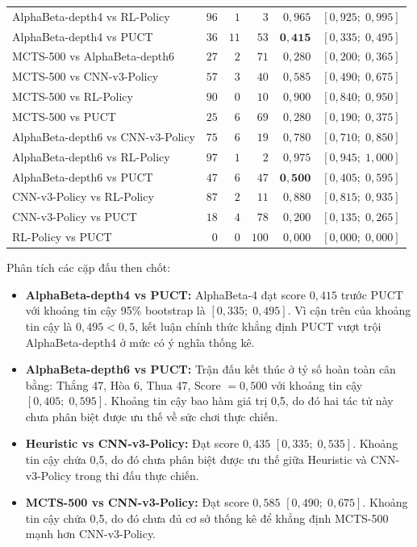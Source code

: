 \documentclass[11pt, a4paper]{article}
\begin{document}
\begin{table}[H]
\begin{tabular}{@{} l r r r r r @{}}
        AlphaBeta-depth4 vs RL-Policy & $96$ & $1$ & $3$ & $0{,}965$ & $[0{,}925;\; 0{,}995]$ \\
        AlphaBeta-depth4 vs PUCT & $36$ & $11$ & $53$ & $\mathbf{0{,}415}$ & $[0{,}335;\; 0{,}495]$ \\
        \midrule
        MCTS-500 vs AlphaBeta-depth6 & $27$ & $2$ & $71$ & $0{,}280$ & $[0{,}200;\; 0{,}365]$ \\
        MCTS-500 vs CNN-v3-Policy & $57$ & $3$ & $40$ & $0{,}585$ & $[0{,}490;\; 0{,}675]$ \\
        MCTS-500 vs RL-Policy & $90$ & $0$ & $10$ & $0{,}900$ & $[0{,}840;\; 0{,}950]$ \\
        MCTS-500 vs PUCT & $25$ & $6$ & $69$ & $0{,}280$ & $[0{,}190;\; 0{,}375]$ \\
        \midrule
        AlphaBeta-depth6 vs CNN-v3-Policy & $75$ & $6$ & $19$ & $0{,}780$ & $[0{,}710;\; 0{,}850]$ \\
        AlphaBeta-depth6 vs RL-Policy & $97$ & $1$ & $2$ & $0{,}975$ & $[0{,}945;\; 1{,}000]$ \\
        AlphaBeta-depth6 vs PUCT & $47$ & $6$ & $47$ & $\mathbf{0{,}500}$ & $[0{,}405;\; 0{,}595]$ \\
        \midrule
        CNN-v3-Policy vs RL-Policy & $87$ & $2$ & $11$ & $0{,}880$ & $[0{,}815;\; 0{,}935]$ \\
        CNN-v3-Policy vs PUCT & $18$ & $4$ & $78$ & $0{,}200$ & $[0{,}135;\; 0{,}265]$ \\
        RL-Policy vs PUCT & $0$ & $0$ & $100$ & $0{,}000$ & $[0{,}000;\; 0{,}000]$ \\
        \bottomrule
    \end{tabular}
\end{table}

Phân tích các cặp đấu then chốt:
\begin{itemize}
    \item \textbf{AlphaBeta-depth4 vs PUCT:} AlphaBeta-4 đạt score $0{,}415$ trước PUCT với khoảng tin cậy 95\% bootstrap là $[0{,}335;\; 0{,}495]$. Vì cận trên của khoảng tin cậy là $0{,}495 < 0{,}5$, kết luận chính thức khẳng định PUCT vượt trội AlphaBeta-depth4 ở mức có ý nghĩa thống kê.
    \item \textbf{AlphaBeta-depth6 vs PUCT:} Trận đấu kết thúc ở tỷ số hoàn toàn cân bằng: Thắng 47, Hòa 6, Thua 47, Score $= 0{,}500$ với khoảng tin cậy $[0{,}405;\; 0{,}595]$. Khoảng tin cậy bao hàm giá trị 0,5, do đó hai tác tử này chưa phân biệt được ưu thế về sức chơi thực chiến.
    \item \textbf{Heuristic vs CNN-v3-Policy:} Đạt score $0{,}435$ $[0{,}335;\; 0{,}535]$. Khoảng tin cậy chứa 0,5, do đó chưa phân biệt được ưu thế giữa Heuristic và CNN-v3-Policy trong thi đấu thực chiến.
    \item \textbf{MCTS-500 vs CNN-v3-Policy:} Đạt score $0{,}585$ $[0{,}490;\; 0{,}675]$. Khoảng tin cậy chứa 0,5, do đó chưa đủ cơ sở thống kê để khẳng định MCTS-500 mạnh hơn CNN-v3-Policy.
\end{itemize}
\end{document}
